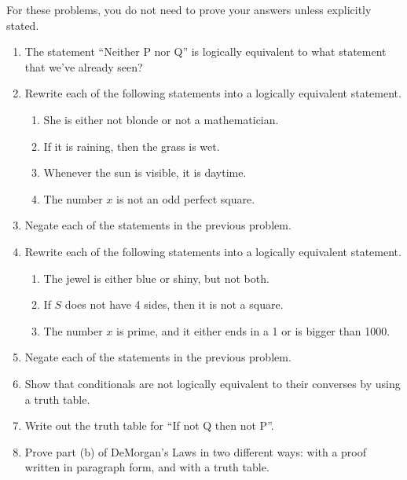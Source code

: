 \probsec{~\ref{sec:negat-logic-equiv}}

For these problems, you do not need to prove your answers unless explicitly stated.

\begin{enumerate}
    \item The statement ``Neither P nor Q'' is logically equivalent to what statement that we've already seen?

    \item Rewrite each of the following statements into a logically equivalent statement.
  \begin{enumerate}
      \item She is either not blonde or not a mathematician.
      \item If it is raining, then the grass is wet.
      \item Whenever the sun is visible, it is daytime.
      \item The number $x$ is not an odd perfect square.
  \end{enumerate}

    \item Negate each of the statements in the previous problem.

    \item Rewrite each of the following statements into a logically equivalent statement.
  \begin{enumerate}
      \item The jewel is either blue or shiny, but not both.
      \item If $S$ does not have 4 sides, then it is not a square.
      \item The number $x$ is prime, and it either ends in a 1 or is
    bigger than 1000.
  \end{enumerate}

    \item Negate each of the statements in the previous problem.

    \item Show that conditionals are not logically equivalent to their converses by using a truth table.

    \item Write out the truth table for ``If not Q then not P''.

    \item Prove part (b) of DeMorgan's Laws in two different ways: with a proof written in paragraph form, and with a truth table.


\end{enumerate}
